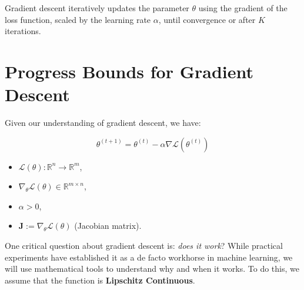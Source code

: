 Gradient descent iteratively updates the parameter $\theta$ using the gradient of the loss function, scaled by the learning rate $\alpha$, until convergence or after $K$ iterations.

\newpage
\section{Progress Bounds for Gradient Descent}

Given our understanding of gradient descent, we have:

\[
    \theta^{(t+1)} = \theta^{(t)} - \alpha \nabla \mathcal{L}(\theta^{(t)})
\]
\begin{itemize}[noitemsep]
    \item \(\mathcal{L}(\theta) : \mathbb{R}^n \rightarrow \mathbb{R}^m\),
    \item \(\nabla_{\theta} \mathcal{L}(\theta) \in \mathbb{R}^{m \times n}\),
    \item \(\alpha > 0\),
    \item \(\bm{J} := \nabla_{\theta} \mathcal{L}(\theta)\) (Jacobian matrix).
\end{itemize}



One critical question about gradient descent is: \textit{does it work}? While practical experiments have established it as a de facto workhorse in machine learning, we will use mathematical tools to understand why and when it works. To do this, we assume that the function is \textbf{Lipschitz Continuous}.


